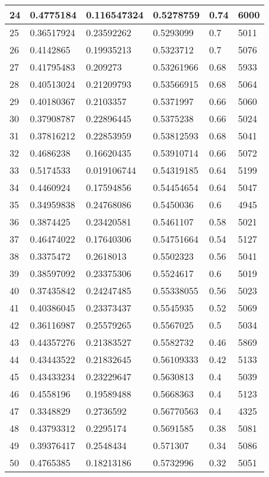 \begin{longtable}{|l|l|l|l|l|l|}
24 & 0.4775184 & 0.116547324 & 0.5278759 & 0.74 & 6000 \\ \hline 
25 & 0.36517924 & 0.23592262 & 0.5293099 & 0.7 & 5011 \\ \hline 
26 & 0.4142865 & 0.19935213 & 0.5323712 & 0.7 & 5076 \\ \hline 
27 & 0.41795483 & 0.209273 & 0.53261966 & 0.68 & 5933 \\ \hline 
28 & 0.40513024 & 0.21209793 & 0.53566915 & 0.68 & 5064 \\ \hline 
29 & 0.40180367 & 0.2103357 & 0.5371997 & 0.66 & 5060 \\ \hline 
30 & 0.37908787 & 0.22896445 & 0.5375238 & 0.66 & 5024 \\ \hline 
31 & 0.37816212 & 0.22853959 & 0.53812593 & 0.68 & 5041 \\ \hline 
32 & 0.4686238 & 0.16620435 & 0.53910714 & 0.66 & 5072 \\ \hline 
33 & 0.5174533 & 0.019106744 & 0.54319185 & 0.64 & 5199 \\ \hline 
34 & 0.4460924 & 0.17594856 & 0.54454654 & 0.64 & 5047 \\ \hline 
35 & 0.34959838 & 0.24768086 & 0.5450036 & 0.6 & 4945 \\ \hline 
36 & 0.3874425 & 0.23420581 & 0.5461107 & 0.58 & 5021 \\ \hline 
37 & 0.46474022 & 0.17640306 & 0.54751664 & 0.54 & 5127 \\ \hline 
38 & 0.3375472 & 0.2618013 & 0.5502323 & 0.56 & 5041 \\ \hline 
39 & 0.38597092 & 0.23375306 & 0.5524617 & 0.6 & 5019 \\ \hline 
40 & 0.37435842 & 0.24247485 & 0.55338055 & 0.56 & 5023 \\ \hline 
41 & 0.40386045 & 0.23373437 & 0.5545935 & 0.52 & 5069 \\ \hline 
42 & 0.36116987 & 0.25579265 & 0.5567025 & 0.5 & 5034 \\ \hline 
43 & 0.44357276 & 0.21383527 & 0.5582732 & 0.46 & 5869 \\ \hline 
44 & 0.43443522 & 0.21832645 & 0.56109333 & 0.42 & 5133 \\ \hline 
45 & 0.43433234 & 0.23229647 & 0.5630813 & 0.4 & 5039 \\ \hline 
46 & 0.4558196 & 0.19589488 & 0.5668363 & 0.4 & 5123 \\ \hline 
47 & 0.3348829 & 0.2736592 & 0.56770563 & 0.4 & 4325 \\ \hline 
48 & 0.43793312 & 0.2295174 & 0.5691585 & 0.38 & 5081 \\ \hline 
49 & 0.39376417 & 0.2548434 & 0.571307 & 0.34 & 5086 \\ \hline 
50 & 0.4765385 & 0.18213186 & 0.5732996 & 0.32 & 5051 \\ \hline 
\end{longtable}